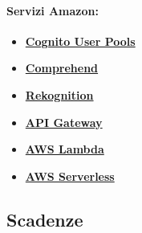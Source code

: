 	\paragraph{\textbf{Servizi Amazon:}} 
\begin{itemize}
	\item
	\href {https://docs.aws.amazon.com/cognito/latest/developerguide/cognito-user-identity-pools.html}{\textbf{Cognito User Pools}}
	\item
	\href{https://docs.aws.amazon.com/comprehend/latest/dg/what-is.html}{\textbf{Comprehend}}
	\item 
	\href{https://docs.aws.amazon.com/rekognition/latest/dg/what-is.html}{\textbf{Rekognition}}
	\item 
	\href{https://docs.aws.amazon.com/apigateway/latest/developerguide/welcome.html}{\textbf{API Gateway}}
	\item
	\href{https://docs.aws.amazon.com/lambda/latest/dg/welcome.html}{\textbf{AWS Lambda}}
	\item 
	\href{https://docs.aws.amazon.com/serverless-application-model/latest/developerguide/what-is-sam.html}{\textbf{AWS Serverless}}
\end{itemize}

\subsection{Scadenze}
